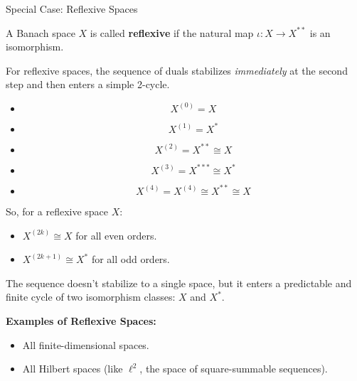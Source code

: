 \documentclass[aps,preprint]{revtex4}
\newenvironment{answer}
  {\begin{tcolorbox}[colback=green!5!white,colframe=green!75!black,title=Answer]}
  {\end{tcolorbox}}
\begin{document}
\begin{answer}
Special Case: Reflexive Spaces

A Banach space $X$ is called \textbf{reflexive} if the natural map $\iota: X
\to X^{**}$ is an isomorphism.

For reflexive spaces, the sequence of duals stabilizes \textit{immediately}
at the second step and then enters a simple 2-cycle.

\begin{itemize}
\item 
\begin{equation}
X^{(0)}=X
\end{equation}

\item 
\begin{equation}
X^{(1)}=X^{\ast }
\end{equation}

\item 
\begin{equation}
X^{(2)}=X^{\ast \ast }\cong X
\end{equation}

\item 
\begin{equation}
X^{(3)}=X^{\ast \ast \ast }\cong X^{\ast }
\end{equation}

\item 
\begin{equation}
X^{(4)}=X^{(4)}\cong X^{\ast \ast }\cong X
\end{equation}
\end{itemize}

So, for a reflexive space $X$:

\begin{itemize}
\item $X^{(2k)} \cong X$ for all even orders.

\item $X^{(2k+1)} \cong X^*$ for all odd orders.
\end{itemize}

The sequence doesn't stabilize to a single space, but it enters a
predictable and finite cycle of two isomorphism classes: $X$ and $X^*$.

\textbf{Examples of Reflexive Spaces:}

\begin{itemize}
\item All finite-dimensional spaces.

\item All Hilbert spaces (like $\ell^2$, the space of square-summable
sequences).


\end{itemize}
\end{answer}
\end{document}
